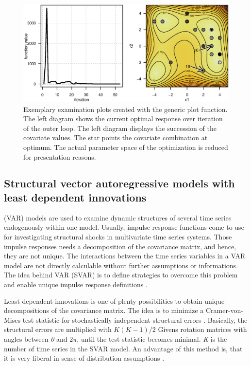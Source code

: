 \begin{figure}[htbp]
\centering
\includegraphics[width=1.025\textwidth]{Fig/fig2-ex2-plot.eps}
\caption{Exemplary examination plots created with the generic plot function. The left diagram shows the current optimal response over iteration of the outer loop. The left diagram displays the succession of the covariate values. The star points the covariate combination at optimum. The actual parameter space of the optimization is reduced for presentation reasons.}
\label{fig:fig2}
\end{figure}

\subsection{Structural vector autoregressive models with least dependent innovations}
 (VAR) models are used to examine dynamic structures of several time series endogenously within one model. Usually, impulse response functions come to use for investigating structural shocks in multivariate time series systems. Those impulse responses needs a decomposition of the covariance matrix, and hence, they are not unique. The interactions between the time series variables in a VAR model are not directly calculable without further assumptions or informations. The idea behind  VAR (SVAR) is to define strategies to overcome this problem and enable unique impulse response definitions \citep{lutkepohl_2006}.

Least dependent innovations is one of plenty possibilities to obtain unique decompositions of the covariance matrix. The idea is to minimize a Cramer-von-Mises test statistic for stochastically independent structural errors \citep{genest_2007}. Basically, the structural errors are multiplied with $K(K-1)/2$ Givens rotation matrices with angles between \textit{0} and $2\pi$, until the test statistic becomes minimal. \textit{K} is the number of time series in the SVAR model. An advantage of this method is, that it is very liberal in sense of distribution assumptions \citep{herwartz_2014}.

